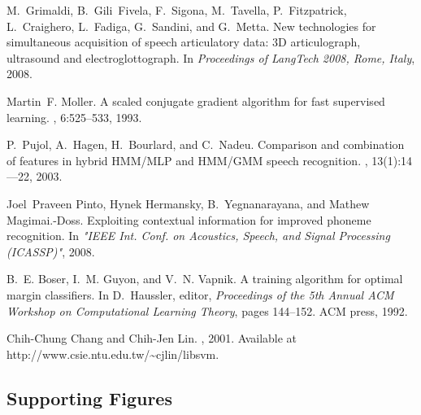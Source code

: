 \documentclass[10pt]{article}
\begin{document}
\begin{thebibliography}{99}

M.~Grimaldi, B.~Gili~Fivela, F.~Sigona, M.~Tavella, P.~Fitzpatrick,
  L.~Craighero, L.~Fadiga, G.~Sandini, and G.~Metta.
\newblock New technologies for simultaneous acquisition of speech articulatory
  data: 3{D} articulograph, ultrasound and electroglottograph.
\newblock In {\em Proceedings of LangTech 2008, Rome, Italy}, 2008.

Martin~F. Moller.
\newblock A scaled conjugate gradient algorithm for fast supervised learning.
, 6:525--533, 1993.

P.~Pujol, A.~Hagen, H.~Bourlard, and C.~Nadeu.
\newblock Comparison and combination of features in hybrid {HMM/MLP} and
  {HMM/GMM} speech recognition.
,
  13(1):14---22, 2003.

Joel~Praveen Pinto, Hynek Hermansky, B.~Yegnanarayana, and Mathew
  Magimai.-Doss.
\newblock Exploiting contextual information for improved phoneme recognition.
\newblock In {\em "{IEEE} Int. Conf. on Acoustics, Speech, and Signal
  Processing ({ICASSP})"}, 2008.

B.~E. Boser, I.~M. Guyon, and V.~N. Vapnik.
\newblock A training algorithm for optimal margin classifiers.
\newblock In D.~Haussler, editor, {\em Proceedings of the 5th Annual ACM
  Workshop on Computational Learning Theory}, pages 144--152. ACM press, 1992.

Chih-Chung Chang and Chih-Jen Lin.
, 2001.
\newblock Available at http://www.csie.ntu.edu.tw/\~{}cjlin/libsvm.

\end{thebibliography}

\begin{center}
\section*{Supporting Figures}
\end{center}
\end{document}
